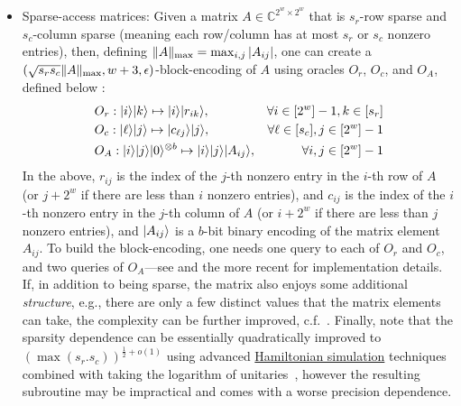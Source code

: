 \begin{refsection}
\begin{itemize}
\item Sparse-access matrices: Given a matrix $A\in\mathbb{C}^{2^w \times 2^w}$ that is $s_r$-row sparse and $s_c$-column sparse (meaning each row/column has at most $s_r$ or $s_c$ nonzero entries), 
then, defining $\lVert A\rVert_{\mathrm{max}} = \max_{i,j} |A_{ij}|$, one can create a $(\sqrt{s_rs_c}\lVert A\rVert_{\mathrm{max}},w+3,\epsilon)$-block-encoding of $A$ using oracles $O_r$, $O_c$, and $O_A$, defined below \cite[Lemma 48]{gilyen2018QSingValTransf}:
\begin{align}
    &O_r:\lvert i\rangle\lvert k\rangle\mapsto \lvert i\rangle\lvert r_{ik}\rangle, &\forall i\in [2^w]-1, k\in [s_r]\\
    &O_c:\lvert\ell\rangle\lvert j\rangle\mapsto \lvert c_{\ell j}\rangle\lvert j\rangle, &\forall \ell\in [s_c], j\in [2^w]-1\\
    &O_A:\lvert i\rangle\lvert j\rangle\lvert0\rangle^{\otimes b}\mapsto \lvert i\rangle\lvert j\rangle\lvert A_{ij}\rangle, &\forall i,j\in [2^w]-1
\end{align}
In the above, $r_{ij}$ is the index of the $j$-th nonzero entry in the $i$-th row of $A$ (or $j+2^w$ if there are less than $i$ nonzero entries), and $c_{ij}$ is the index of the $i$-th nonzero entry in the $j$-th column of $A$ (or $i+2^w$ if there are less than $j$ nonzero entries), and $\lvert A_{ij}\rangle$ is a $b$-bit binary encoding of the matrix element $A_{ij}$. To build the block-encoding, one needs one query to each of $O_r$ and $O_c$, and two queries of $O_A$---see \cite[Lemma 48]{gilyen2018QSingValTransf} and the more recent \cite{sanders2019BlackBoxQuantumStatePreparation} for implementation details.
If, in addition to being sparse, the matrix also enjoys some additional \textit{structure}, e.g., there are only a few distinct values that the matrix elements can take, the complexity can be further improved, c.f.~\cite{sunderhauf2023block, camps2023explicitBlockEncoding}.
Finally, note that the sparsity dependence can be essentially quadratically improved to $(\max(s_r.s_c))^{\frac{1}{2}+o(1)}$ using advanced \hyperref[prim:HamiltonianSimulation]{Hamiltonian simulation} techniques~\cite[Theorem 2]{low2018HamSimNearlyOptSpecNorm} combined with taking the logarithm of unitaries~\cite[Corollary 71]{gilyen2018QSingValTransf}, however the resulting subroutine may be impractical and comes with a worse precision dependence.


\end{itemize}
\end{refsection}

